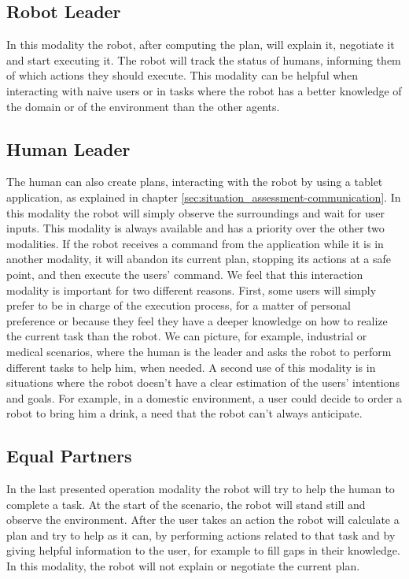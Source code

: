 \subsection{Robot Leader}
In this modality the robot, after computing the plan, will explain it, negotiate it and start executing it.
The robot will track the status of humans, informing them of which actions they should execute. This modality can be helpful when interacting with  naive users or in tasks where the robot has a better knowledge of the
domain or of the environment than the other agents.

\subsection{Human Leader}
The human can also create plans, interacting with the robot by using a
tablet application, as explained in chapter \ref{sec:situation_assessment-communication}. In this modality the robot   will simply observe the surroundings and wait for user inputs. This modality is always available and has a priority over
the other two modalities. If the robot receives a command from the
application while it is in another modality, it will abandon its current
plan, stopping its actions at a safe point, and then execute the users'
command. We feel that this interaction modality is important for two
different reasons.  First, some users will simply prefer to be in
charge of the execution process, for a matter of personal preference or because they
feel they have a deeper knowledge on how to realize the current task
than the robot. We can picture, for example, industrial or medical
scenarios, where the human is the leader and asks the robot to perform
different tasks to help him, when needed. A second use of this modality is in situations where
the robot doesn't have  a clear estimation of the users' intentions and
goals. For example, in a domestic environment, a user could decide to
order a robot to bring him a drink, a need that the robot can't always anticipate.

\subsection{Equal Partners}
In the last presented operation modality the robot will try to help
the human to complete a task. At the start of the scenario, the robot
will stand still and observe the environment. After the user takes an
action the robot will calculate a plan and try to help as it can, by
performing actions related to that task and by giving helpful information to
the user, for example to fill gaps in their knowledge. In this modality, 
the robot will not explain or negotiate the current plan.


